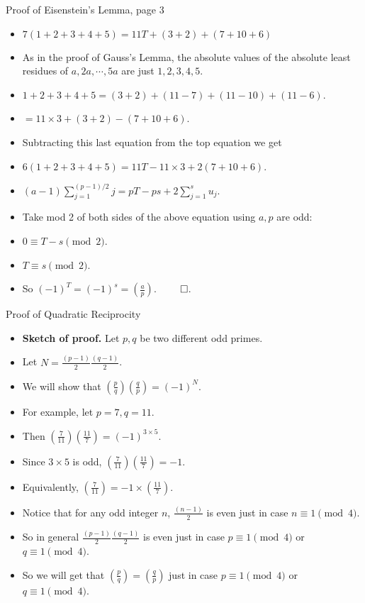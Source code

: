 \documentclass[handout]{beamer}
\begin{document}
\begin{frame}{Proof of Eisenstein's Lemma, page 3}

\begin{itemize}
  \item $7(1+2+3+4+5)=11T + (3 + 2) + (7 + 10 + 6)$
  \item As in the proof of Gauss's Lemma, the absolute values of the absolute least residues of
  $a,2a,\cdots, 5a$ are just $1,2,3,4,5$.
  \item $1 + 2 + 3 + 4 + 5 = (3 + 2) + (11 - 7) + (11 - 10) + (11 - 6)$.
  \item $= 11\times 3 + (3 + 2) - (7 + 10 + 6)$.
  \item Subtracting this last equation from the top equation we get
  \item $6(1 + 2 + 3 + 4 + 5) = 11T - 11\times 3 + 2 (7 + 10 + 6)$.
  \item $(a-1)\sum_{j=1}^{(p-1)/2}j = pT - ps + 2 \sum_{j=1}^{s}{u_j}$.
  \item Take mod 2 of both sides of the above equation using $a,p$ are odd:
  \item $0 \equiv T -s \pmod 2$.
  \item $T \equiv s \pmod 2$.
  \item So $(-1)^T = (-1)^s = (\frac{a}{p})$. $\qed$.
\end{itemize}
\end{frame}

\begin{frame}{Proof of Quadratic Reciprocity}

\begin{itemize}
  \item \textbf{Sketch of proof.} Let $p,q$ be two different odd primes.
  \item Let $N = \frac{(p-1)}{2}\frac{(q-1)}{2}$.
  \item We will show that $(\frac{p}{q})(\frac{q}{p}) = (-1)^N$.
  \item For example, let $p=7, q=11$.
  \item Then $(\frac{7}{11})(\frac{11}{7}) = (-1)^{3\times5}$.
  \item Since $3\times 5$ is odd, $(\frac{7}{11})(\frac{11}{7}) = -1$.
  \item Equivalently, $(\frac{7}{11}) = -1 \times (\frac{11}{7})$.
  \item Notice that for any odd integer $n$, $\frac{(n-1)}{2}$ is even just in case $n\equiv 1 \pmod 4$.
  \item So in general $\frac{(p-1)}{2}\frac{(q-1)}{2}$ is even just in case $p\equiv 1 \pmod 4$ or $q\equiv 1 \pmod 4$.
  \item So we will get that $(\frac{p}{q})=(\frac{q}{p})$ just in case $p\equiv 1 \pmod 4$ or $q\equiv 1 \pmod 4$.
\end{itemize}
\end{frame}
\end{document}
